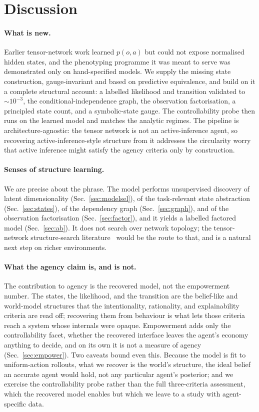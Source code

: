 \documentclass[runningheads]{llncs}
\begin{document}
\section{Discussion}\label{sec:discussion}

\paragraph{What is new.} Earlier tensor-network work learned $p(o,a)$ but could not
expose normalised hidden states, and the phenotyping programme it was meant to serve
was demonstrated only on hand-specified models. We supply the missing state
construction, gauge-invariant and based on predictive equivalence, and build on it a
complete structural account: a labelled likelihood and transition validated to
$\sim\!10^{-3}$, the conditional-independence graph, the observation factorisation, a
principled state count, and a symbolic-state gauge. The controllability probe then runs
on the learned model and matches the analytic regimes. The pipeline is architecture-agnostic:
the tensor network is not an active-inference agent, so recovering active-inference-style
structure from it addresses the circularity worry that active inference might satisfy
the agency criteria only by construction.

\paragraph{Senses of structure learning.} We are precise about the phrase. The model
performs unsupervised discovery of latent dimensionality (Sec.~\ref{sec:modelsel}), of
the task-relevant state abstraction (Sec.~\ref{sec:states}), of the dependency graph
(Sec.~\ref{sec:graph}), and of the observation factorisation (Sec.~\ref{sec:factor}),
and it yields a labelled factored model (Sec.~\ref{sec:ab}). It does not search over
network topology; the tensor-network structure-search
literature~\cite{li2022,li2023tnale} would be the route to that, and is a natural next
step on richer environments.

\paragraph{What the agency claim is, and is not.} The contribution to agency is the
recovered model, not the empowerment number. The states, the likelihood, and the
transition are the belief-like and world-model structures that the intentionality,
rationality, and explainability criteria are read off; recovering them from behaviour is
what lets those criteria reach a system whose internals were opaque. Empowerment adds
only the controllability facet, whether the recovered interface leaves the agent's
economy anything to decide, and on its own it is not a measure of agency
(Sec.~\ref{sec:empower}). Two caveats bound even this. Because the model is fit to
uniform-action rollouts, what we recover is the world's structure, the ideal belief an
accurate agent would hold, not any particular agent's posterior; and we exercise the
controllability probe rather than the full three-criteria assessment, which the recovered
model enables but which we leave to a study with agent-specific data.
\end{document}
